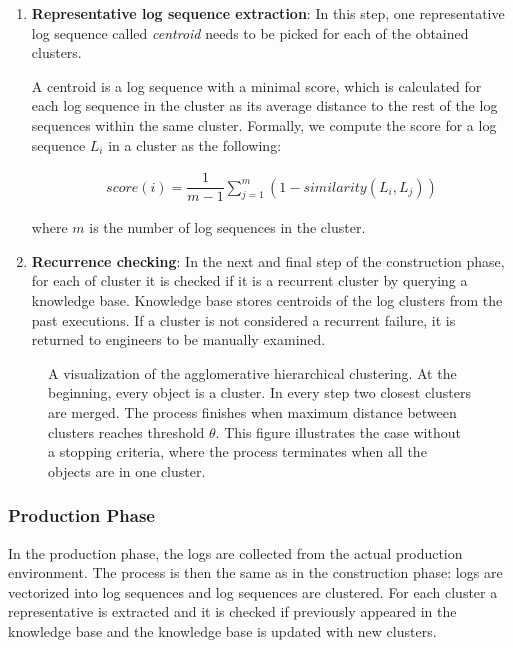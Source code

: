 \begin{enumerate}
    \item \textbf{Representative log sequence extraction}: In this step, one representative log sequence called \textit{centroid} needs to be picked for each of the obtained clusters.
    
    A centroid is a log sequence with a minimal score, which is calculated for each log sequence in the cluster as its average distance to the rest of the log sequences within the same cluster. Formally, we compute the score for a log sequence $L_i$ in a cluster as the following:
    
    \begin{align*}
        score(i) = \dfrac{1}{m - 1} \sum_{j = 1}^m (1 - similarity(L_i, L_j))
    \end{align*}
    
    where $m$ is the number of log sequences in the cluster.
    
    \item \textbf{Recurrence checking}: In the next and final step of the construction phase, for each of cluster it is checked if it is a recurrent cluster by querying a knowledge base. Knowledge base stores centroids of the log clusters from the past executions. If a cluster is not considered a recurrent failure, it is returned to engineers to be manually examined.
\end{enumerate}

\begin{figure}\centering
	
	\caption{A visualization of the agglomerative hierarchical clustering. At the beginning, every object is a cluster. In every step two closest clusters are merged. The process finishes when maximum distance between clusters reaches threshold $\theta$. This figure illustrates the case without a stopping criteria, where the process terminates when all the objects are in one cluster.}
	\label{figure:hierarchicalClustering}
\end{figure}


\subsubsection*{Production Phase}
In the production phase, the logs are collected from the actual production environment. The process is then the same as in the construction phase: logs are vectorized into log sequences and log sequences are clustered. For each cluster a representative is extracted and it is checked if previously appeared in the knowledge base and the knowledge base is updated with new clusters.
 
